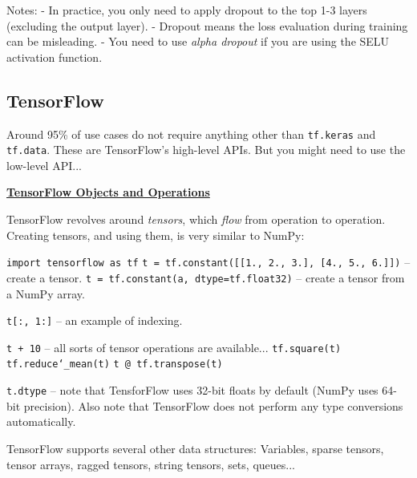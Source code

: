 Notes:\newline
- In practice, you only need to apply dropout to the top 1-3 layers (excluding the output layer).\newline
- Dropout means the loss evaluation during training can be misleading.\newline
- You need to use \textit{alpha dropout} if you are using the SELU activation function.

\newpage
\subsection{TensorFlow}

Around 95\% of use cases do not require anything other than \texttt{tf.keras} and \texttt{tf.data}.\newline
These are TensorFlow's high-level APIs.
But you might need to use the low-level API...\newline

\textbf{\underline{TensorFlow Objects and Operations}}

TensorFlow revolves around \textit{tensors}, which \textit{flow} from operation to operation.\newline
Creating tensors, and using them, is very similar to NumPy:

\texttt{import tensorflow as tf}\newline
\texttt{t = tf.constant([[1., 2., 3.], [4., 5., 6.]])} -- create a tensor.\newline
\texttt{t = tf.constant(a, dtype=tf.float32)} -- create a tensor from a NumPy array.

\texttt{t[:, 1:]} -- an example of indexing.

\texttt{t + 10} -- all sorts of tensor operations are available...\newline
\texttt{tf.square(t)}\newline
\texttt{tf.reduce\char`_mean(t)}\newline
\texttt{t @ tf.transpose(t)}

\texttt{t.dtype} -- note that TensforFlow uses 32-bit floats by default (NumPy uses 64-bit precision).\newline
Also note that TensorFlow does not perform any type conversions automatically.

TensorFlow supports several other data structures:\newline
Variables, sparse tensors, tensor arrays, ragged tensors, string tensors, sets, queues...\newline

